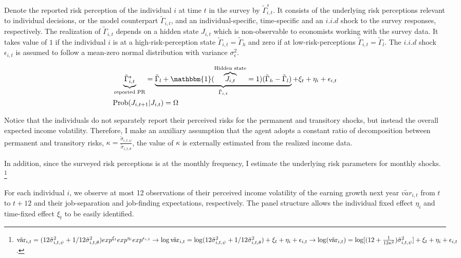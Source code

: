 Denote the reported risk perception of the individual $i$ at time $t$ in the survey by $\tilde \Gamma^s_{i,t}$. It consists of the underlying risk perceptions relevant to individual decisions, or the model counterpart $\tilde \Gamma_{i,t}$, and an individual-specific, time-specific and an $i.i.d$ shock to the survey responses, respectively. The realization of $\tilde \Gamma_{i,t}$ depends on a hidden state $J_{i,t}$ which is non-observable to economists working with the survey data. It takes value of $1$ if the individual $i$ is at a high-risk-perception state $\tilde \Gamma_{i,t}=\tilde \Gamma_h$ and zero if at low-risk-perceptions $\tilde \Gamma_{i,t} = \tilde \Gamma_l$. The $i.i.d$ shock $\epsilon_{i,t}$ is assumed to follow a mean-zero normal distribution with variance $\sigma^2_\epsilon$.  

\begin{equation*}
	\begin{split}
&	\underbrace{\tilde \Gamma^s_{i,t}}_{\text{reported PR}} = \underbrace{\tilde \Gamma_l + \mathbbm{1}(\overbrace{J_{i,t}}^{\text{Hidden state}}= 1)( \tilde \Gamma_h -\tilde \Gamma_l)}_{\tilde \Gamma_{i,t}} +\xi_{t}+\eta_{i}+ \epsilon_{i,t}\\
& \text{Prob}(J_{i,t+1}|J_{i,t}) = \Omega
\end{split}
\end{equation*}

Notice that the individuals do not separately report their perceived risks for the permanent and transitory shocks, but instead the overall expected income volatility. Therefore, I make an auxiliary assumption that the agent adopts a constant ratio of decomposition between permanent and transitory risks, $\kappa =\frac{\tilde \sigma_{i,t,\psi}}{\tilde \sigma_{i,t,\theta}}$, the value of $\kappa$ is externally estimated from the realized income data. 

In addition, since the surveyed risk perceptions is at the monthly frequency, I estimate the underlying risk parameters for monthly shocks. \footnote{
$\tilde {\text{var}}_{i,t}= (12 \tilde \sigma^2_{i,t,\psi} + 1/12 \tilde \sigma^2_{i,t,\theta})exp^{\xi_{t}}exp^{\eta_{i}}exp^{\epsilon_{i,t}} \rightarrow
\log \tilde {\text{var}}_{i,t}= \log (12 \tilde \sigma^2_{i,t,\psi} + 1/12 \tilde \sigma^2_{i,t,\theta})+\xi_{t}+\eta_{i}+\epsilon_{i,t} \rightarrow
\log(\tilde {\text{var}}_{i,t})= \log [(12+\frac{1}{12\kappa^2})\tilde \sigma^2_{i,t,\psi}] + \xi_{t}+\eta_{i}+ \epsilon_{i,t}$.}

For each individual $i$, we observe at most 12 observations of their perceived income volatility of the earning growth next year $\tilde {var}_{i,t}$ from $t$ to $t+12$ and their job-separation and job-finding expectations, respectively. The panel structure allows the individual fixed effect $\eta_i$ and time-fixed effect $\xi_t$ to be easily identified.  

